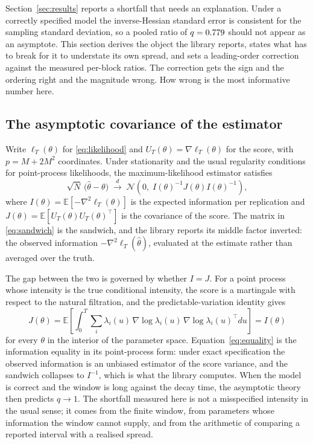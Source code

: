 Section~\ref{sec:results} reports a shortfall that needs an explanation. Under a
correctly specified model the inverse-Hessian standard error is consistent for the
sampling standard deviation, so a pooled ratio of $q = 0.779{}$ should not appear
as an asymptote. This section derives the object the library reports, states what
has to break for it to understate its own spread, and sets a leading-order
correction against the measured per-block ratios. The correction gets the sign and
the ordering right and the magnitude wrong. How wrong is the most informative
number here.

\subsection{The asymptotic covariance of the estimator}

Write $\ell_T(\theta)$ for \eqref{eq:likelihood} and $U_T(\theta) = \nabla\ell_T(\theta)$
for the score, with $p = M + 2M^2$ coordinates. Under stationarity and the usual
regularity conditions for point-process likelihoods, the maximum-likelihood
estimator satisfies
\begin{equation}
\sqrt{N}\,\big(\hat\theta - \theta\big) \;\overset{d}{\longrightarrow}\;
\mathcal{N}\!\left(0,\; I(\theta)^{-1} J(\theta) I(\theta)^{-1}\right),
\label{eq:sandwich}
\end{equation}
where $I(\theta) = \mathbb{E}[-\nabla^2 \ell_T(\theta)]$ is the expected
information per replication and $J(\theta) = \mathbb{E}[U_T(\theta) U_T(\theta)^{\top}]$
is the covariance of the score. The matrix in \eqref{eq:sandwich} is the sandwich,
and the library reports its middle factor inverted: the observed information
$-\nabla^2 \ell_T(\hat\theta)$, evaluated at the estimate rather than averaged
over the truth.

The gap between the two is governed by whether $I = J$. For a point process whose
intensity is the true conditional intensity, the score is a martingale with
respect to the natural filtration, and the predictable-variation identity gives
\begin{equation}
J(\theta) = \mathbb{E}\!\left[\int_0^T \sum_{i} \lambda_i(u)\,
\nabla\log\lambda_i(u)\,\nabla\log\lambda_i(u)^{\top} du\right] = I(\theta)
\label{eq:equality}
\end{equation}
for every $\theta$ in the interior of the parameter space. Equation~\eqref{eq:equality}
is the information equality in its point-process form: under exact specification the
observed information is an unbiased estimator of the score variance, and the
sandwich collapses to $I^{-1}$, which is what the library computes. When the model
is correct and the window is long against the decay time, the asymptotic theory
then predicts $q \to 1$. The shortfall measured here is not a misspecified
intensity in the usual sense; it comes from the finite window, from parameters whose
information the window cannot supply, and from the arithmetic of comparing a
reported interval with a realised spread.

